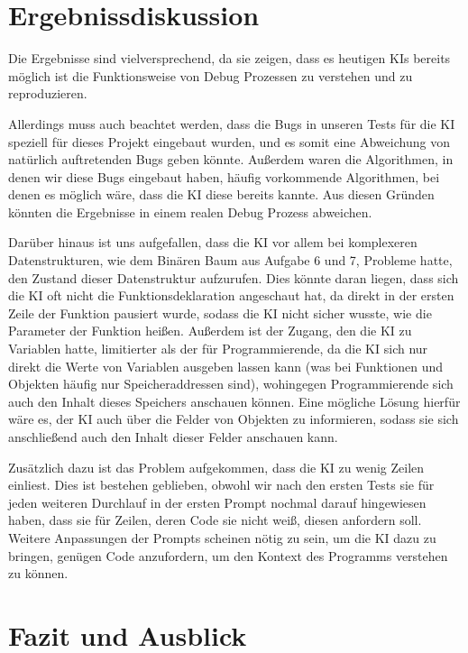 \documentclass[a4paper,12pt,ngerman]{scrartcl}
\begin{document}
\section{Ergebnissdiskussion}

Die Ergebnisse sind vielversprechend, da sie zeigen, dass es heutigen KIs bereits möglich ist die Funktionsweise von Debug Prozessen zu verstehen und zu reproduzieren.

Allerdings muss auch beachtet werden, dass die Bugs in unseren Tests für die KI speziell für dieses Projekt eingebaut wurden, und es somit eine Abweichung von natürlich auftretenden Bugs geben könnte. Außerdem waren die Algorithmen, in denen wir diese Bugs eingebaut haben, häufig vorkommende Algorithmen, bei denen es möglich wäre, dass die KI diese bereits kannte. Aus diesen Gründen könnten die Ergebnisse in einem realen Debug Prozess abweichen.

Darüber hinaus ist uns aufgefallen, dass die KI vor allem bei komplexeren Datenstrukturen, wie dem Binären Baum aus Aufgabe 6 und 7, Probleme hatte, den Zustand dieser Datenstruktur aufzurufen. Dies könnte daran liegen, dass sich die KI oft nicht die Funktionsdeklaration angeschaut hat, da direkt in der ersten Zeile der Funktion pausiert wurde, sodass die KI nicht sicher wusste, wie die Parameter der Funktion heißen. Außerdem ist der Zugang, den die KI zu Variablen hatte, limitierter als der für Programmierende, da die KI sich nur direkt die Werte von Variablen ausgeben lassen kann (was bei Funktionen und Objekten häufig nur Speicheraddressen sind), wohingegen Programmierende sich auch den Inhalt dieses Speichers anschauen können. Eine mögliche Lösung hierfür wäre es, der KI auch über die Felder von Objekten zu informieren, sodass sie sich anschließend auch den Inhalt dieser Felder anschauen kann.

Zusätzlich dazu ist das Problem aufgekommen, dass die KI zu wenig Zeilen einliest. Dies ist bestehen geblieben, obwohl wir nach den ersten Tests sie für jeden weiteren Durchlauf in der ersten Prompt nochmal darauf hingewiesen haben, dass sie für Zeilen, deren Code sie nicht weiß, diesen anfordern soll. Weitere Anpassungen der Prompts scheinen nötig zu sein, um die KI dazu zu bringen, genügen Code anzufordern, um den Kontext des Programms verstehen zu können.

\section{Fazit und Ausblick}
\end{document}
